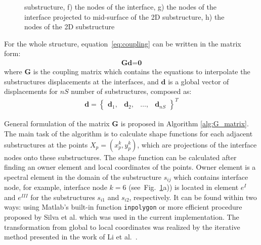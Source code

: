 \documentclass[a4paper,12pt]{article}
\begin{document}
{\begin{figure}
{	substructure, f) the nodes of the interface, g) the nodes of the interface projected to mid-surface of the 2D substructure, h) the nodes of the 2D substructure}
	\label{fig:interface}
\end{figure}
For the whole structure, equation~\ref{eq:coupling} can be written in the 
matrix form:
\begin{eqnarray}
\textbf{G}\textbf{d}=\textbf{0}
\label{eq:cond_disp}
\end{eqnarray}
where \textbf{G} is the coupling matrix which contains the equations to 
interpolate the substructures displacements at the interfaces, and 
\(\textbf{d}\) is a global vector of displacements for \(nS\) number of 
substructures, composed as:
\begin{eqnarray}
\textbf{d} = \left\{\begin{array}{cccc}
\textbf{d}_1, & \textbf{d}_2, &\ldots, & \textbf{d}_{nS}
\end{array}\right\}^T
\label{eq:displacements}
\end{eqnarray}

General formulation of the matrix \textbf{G} is proposed in Algorithm 
\ref{alg:G_matrix}.
The main task of the algorithm is to calculate shape functions for each 
adjacent substructures at the points \(X_p=(x_p^k,y_p^k)\), which are 
projections of the interface nodes onto these substructures.
The shape function can be calculated after finding an owner element and local 
coordinates of the points.
Owner element is a spectral element in the domain of the substructure \(s_{ij}\) which contains interface node, for example, interface node \(k=6\) 
(see~Fig.~\ref{fig:interface}a)) is located in element \(e^I\) and 
\(e^{III}\) for the substructures \(s_{i1}\) and \(s_{i2}\), respectively.
It can be found within two ways: using Matlab's built-in function 
\verb+inpolygon+ or more efficient procedure proposed by Silva et al. 
\cite{silva2009exact} which was used in the current implementation.
The transformation from global to local coordinates was realized by the 
iterative method presented in the work of Li et al.~\cite{li2014efficient}.


}
\end{document}
